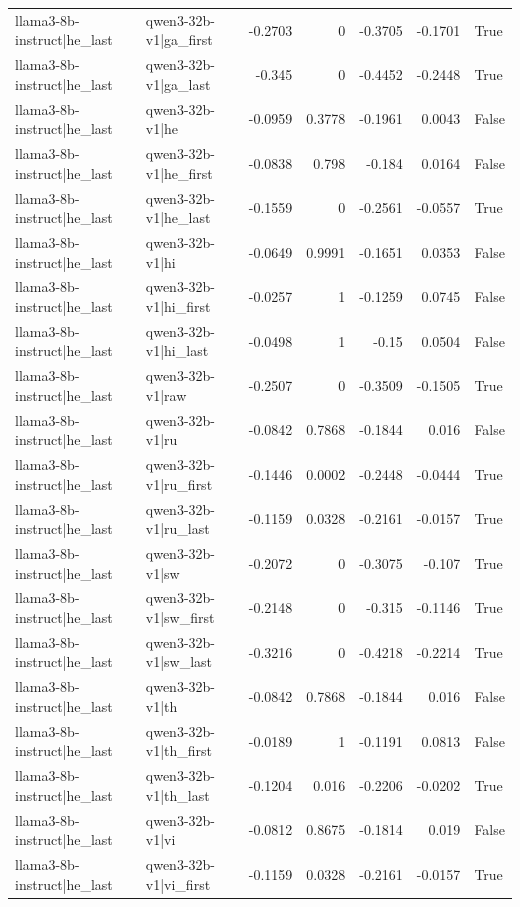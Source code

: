 \begin{table}
\begin{tabular}{l l r r r r l}
llama3-8b-instruct|he_last & qwen3-32b-v1|ga_first & -0.2703 & 0 & -0.3705 & -0.1701 & True \\
llama3-8b-instruct|he_last & qwen3-32b-v1|ga_last & -0.345 & 0 & -0.4452 & -0.2448 & True \\
llama3-8b-instruct|he_last & qwen3-32b-v1|he & -0.0959 & 0.3778 & -0.1961 & 0.0043 & False \\
llama3-8b-instruct|he_last & qwen3-32b-v1|he_first & -0.0838 & 0.798 & -0.184 & 0.0164 & False \\
llama3-8b-instruct|he_last & qwen3-32b-v1|he_last & -0.1559 & 0 & -0.2561 & -0.0557 & True \\
llama3-8b-instruct|he_last & qwen3-32b-v1|hi & -0.0649 & 0.9991 & -0.1651 & 0.0353 & False \\
llama3-8b-instruct|he_last & qwen3-32b-v1|hi_first & -0.0257 & 1 & -0.1259 & 0.0745 & False \\
llama3-8b-instruct|he_last & qwen3-32b-v1|hi_last & -0.0498 & 1 & -0.15 & 0.0504 & False \\
llama3-8b-instruct|he_last & qwen3-32b-v1|raw & -0.2507 & 0 & -0.3509 & -0.1505 & True \\
llama3-8b-instruct|he_last & qwen3-32b-v1|ru & -0.0842 & 0.7868 & -0.1844 & 0.016 & False \\
llama3-8b-instruct|he_last & qwen3-32b-v1|ru_first & -0.1446 & 0.0002 & -0.2448 & -0.0444 & True \\
llama3-8b-instruct|he_last & qwen3-32b-v1|ru_last & -0.1159 & 0.0328 & -0.2161 & -0.0157 & True \\
llama3-8b-instruct|he_last & qwen3-32b-v1|sw & -0.2072 & 0 & -0.3075 & -0.107 & True \\
llama3-8b-instruct|he_last & qwen3-32b-v1|sw_first & -0.2148 & 0 & -0.315 & -0.1146 & True \\
llama3-8b-instruct|he_last & qwen3-32b-v1|sw_last & -0.3216 & 0 & -0.4218 & -0.2214 & True \\
llama3-8b-instruct|he_last & qwen3-32b-v1|th & -0.0842 & 0.7868 & -0.1844 & 0.016 & False \\
llama3-8b-instruct|he_last & qwen3-32b-v1|th_first & -0.0189 & 1 & -0.1191 & 0.0813 & False \\
llama3-8b-instruct|he_last & qwen3-32b-v1|th_last & -0.1204 & 0.016 & -0.2206 & -0.0202 & True \\
llama3-8b-instruct|he_last & qwen3-32b-v1|vi & -0.0812 & 0.8675 & -0.1814 & 0.019 & False \\
llama3-8b-instruct|he_last & qwen3-32b-v1|vi_first & -0.1159 & 0.0328 & -0.2161 & -0.0157 & True \\

\end{tabular}
\end{table}
